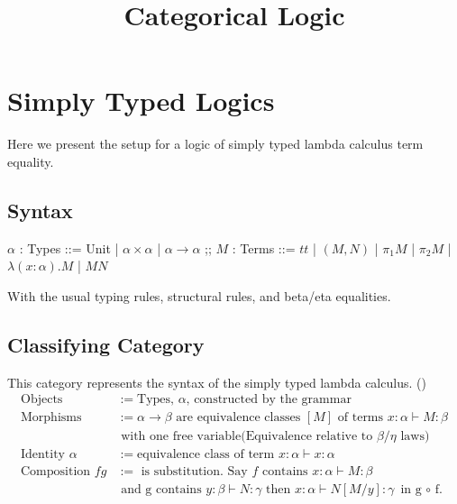 \documentclass{article}
\title{Categorical Logic}
\begin{document}
\maketitle

\section{Simply Typed Logics}
Here we present the setup for a logic of simply typed lambda calculus term equality.

\subsection{Syntax}
\begin{bnf}
    $\alpha$ : Types ::= Unit | $\alpha \times \alpha$ | $\alpha \rightarrow \alpha$ ;;
    $M$ : Terms ::= $tt$ | $(M , N)$ | $\pi_1 M$ | $\pi_2 M$ | $\lambda (x \colon \alpha). M$ | $MN$
\end{bnf}

With the usual typing rules, structural rules, and beta/eta equalities.
\subsection{Classifying Category}
This category represents the syntax of the simply typed lambda calculus. 
()
\begin{align*}
    \textrm{Objects} &:= \textrm{Types, $\alpha$, constructed by the grammar}\\
    \textrm{Morphisms} &:= \alpha \rightarrow \beta \textrm{ are equivalence classes $[M]$ of terms } x : \alpha \vdash M : \beta \\
    &\textrm{ with one free variable(Equivalence relative to } \beta/\eta \textrm{ laws})\\
    \textrm{Identity } \alpha &:= \textrm{equivalence class of term } x : \alpha \vdash x : \alpha\\
    \textrm{Composition }f g  &:= \textrm{ is substitution. Say } f \textrm{ contains } x : \alpha \vdash M : \beta\\
    &\textrm{ and g contains } y : \beta \vdash N : \gamma \textrm{ then } x : \alpha \vdash N[M/y] : \gamma \textrm { in g $\circ$ f.}
\end{align*}
\end{document}
